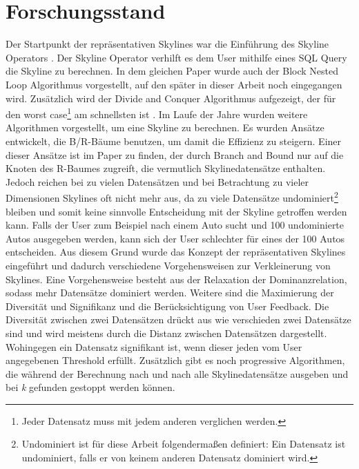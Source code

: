 \chapter{Forschungsstand}
\label{ch:Forschungsstand}
Der Startpunkt der repräsentativen Skylines war die Einführung des Skyline Operators \cite{borzsony2001skyline}. Der Skyline Operator verhilft es dem User mithilfe eines SQL Query die Skyline zu berechnen. In dem gleichen Paper wurde auch der Block Nested Loop Algorithmus vorgestellt, auf den später in dieser Arbeit noch eingegangen wird. Zusätzlich wird der Divide and Conquer Algorithmus aufgezeigt, der für den worst case\footnote{Jeder Datensatz muss mit jedem anderen verglichen werden.} am schnellsten ist \cite[p. 435]{borzsony2001skyline}. Im Laufe der Jahre wurden weitere Algorithmen vorgestellt, um eine Skyline zu berechnen. Es wurden Ansätze entwickelt, die B/R-Bäume benutzen, um damit die Effizienz zu steigern. Einer dieser Ansätze ist im Paper \cite{Papadias:2003:OPA:872757.872814} zu finden, der durch Branch and Bound nur auf die Knoten des R-Baumes zugreift, die vermutlich Skylinedatensätze enthalten. 
Jedoch reichen bei zu vielen Datensätzen und bei Betrachtung zu vieler Dimensionen Skylines oft nicht mehr aus, da zu viele Datensätze undominiert\footnote{Undominiert ist für diese Arbeit folgendermaßen definiert: Ein Datensatz ist undominiert, falls er von keinem anderen Datensatz dominiert wird.} bleiben und somit keine sinnvolle Entscheidung mit der Skyline getroffen werden kann. Falls der User zum Beispiel nach einem Auto sucht und 100 undominierte Autos ausgegeben werden, kann sich der User schlechter für eines der 100 Autos entscheiden.
Aus diesem Grund wurde das Konzept der repräsentativen Skylines eingeführt und dadurch verschiedene Vorgehensweisen zur Verkleinerung von Skylines. 
Eine Vorgehensweise besteht aus der Relaxation der Dominanzrelation, sodass mehr Datensätze dominiert werden. Weitere sind die Maximierung der Diversität und Signifikanz und die Berücksichtigung von User Feedback. Die Diversität zwischen zwei Datensätzen drückt aus wie verschieden zwei Datensätze sind und wird meistens durch die Distanz zwischen Datensätzen dargestellt. Wohingegen ein Datensatz signifikant ist, wenn dieser jeden vom User angegebenen Threshold erfüllt. Zusätzlich gibt es noch progressive Algorithmen, die während der Berechnung nach und nach alle Skylinedatensätze ausgeben und bei \textit{k} gefunden gestoppt werden können.
